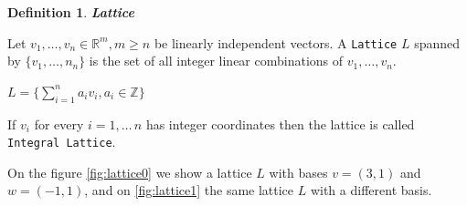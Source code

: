 \documentclass[a4paper,12pt]{report}
\newtheorem{definition}{Definition}[section]
\newcommand{\R}{\mathbb{R}}
\newcommand{\Z}{\mathbb{Z}}
\begin{document}
\begin{definition}
    \textbf{Lattice}
\end{definition}

Let $v_1,\ldots,v_n \in \R^m, m \ge n$ be linearly independent vectors. A \texttt{Lattice} $L$ spanned by $\{v_1,\ldots,n_n\}$ is the set of 
all integer linear combinations of $v_1,\ldots,v_n$.

\begin{center}
    $L = \bigg\{\sum_{i=1}^{n} a_iv_i, a_i \in \Z \bigg\}$
\end{center}

If $v_i$ for every $i = 1,\ldots\,n$ has integer coordinates then the lattice is
called \texttt{Integral Lattice}.

On the figure \ref{fig:lattice0} we show a lattice $L$ with bases $v=(3, 1)$ and $w=(-1, 1)$, and on \ref{fig:lattice1} the same lattice $L$ with
a different basis.
\end{document}
